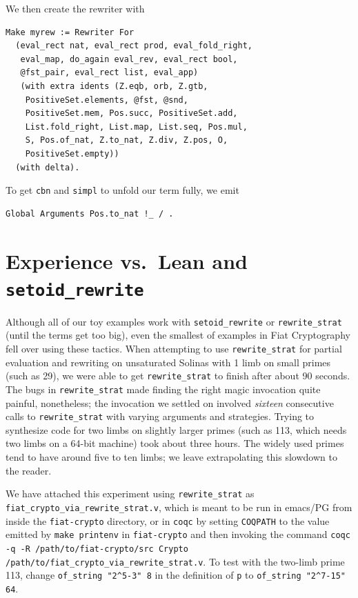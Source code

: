 \begin{subappendices}
We then create the rewriter with
\begin{verbatim}
Make myrew := Rewriter For
  (eval_rect nat, eval_rect prod, eval_fold_right,
   eval_map, do_again eval_rev, eval_rect bool,
   @fst_pair, eval_rect list, eval_app)
   (with extra idents (Z.eqb, orb, Z.gtb,
    PositiveSet.elements, @fst, @snd,
    PositiveSet.mem, Pos.succ, PositiveSet.add,
    List.fold_right, List.map, List.seq, Pos.mul,
    S, Pos.of_nat, Z.to_nat, Z.div, Z.pos, O,
    PositiveSet.empty))
  (with delta).
\end{verbatim}

To get \texttt{cbn} and \texttt{simpl} to unfold our term fully, we emit
\begin{verbatim}
Global Arguments Pos.to_nat !_ / .
\end{verbatim}


\section{Experience vs.\ Lean and \texorpdfstring{\texttt{setoid\_rewrite}}{setoid\_rewrite}\label{sec:lean}}

Although all of our toy examples work with \texttt{setoid\_rewrite} or \texttt{rewrite\_strat} (until the terms get too big), even the smallest of examples in Fiat Cryptography fell over using these tactics.
When attempting to use \texttt{rewrite\_strat} for partial evaluation and rewriting on unsaturated Solinas with 1 limb on small primes (such as 29), we were able to get \texttt{rewrite\_strat} to finish after about 90 seconds.
The bugs in \texttt{rewrite\_strat} made finding the right magic invocation quite painful, nonetheless; the invocation we settled on involved \emph{sixteen} consecutive calls to \texttt{rewrite\_strat} with varying arguments and strategies.
Trying to synthesize code for two limbs on slightly larger primes (such as 113, which needs two limbs on a 64-bit machine) took about three hours.
The widely used primes tend to have around five to ten limbs; we leave extrapolating this slowdown to the reader.

We have attached this experiment using \verb|rewrite_strat| as \verb|fiat_crypto_via_rewrite_strat.v|, which is meant to be run in emacs/PG from inside the \verb|fiat-crypto| directory, or in \verb|coqc| by setting \verb|COQPATH| to the value emitted by \texttt{make printenv} in \verb|fiat-crypto| and then invoking the command \texttt{coqc -q -R /path/to/fiat-crypto/src Crypto /path/to/fiat\_crypto\_via\_rewrite\_strat.v}.
To test with the two-limb prime 113, change \verb|of_string "2^5-3" 8| in the definition of \verb|p| to \verb|of_string "2^7-15" 64|.


\end{subappendices}
